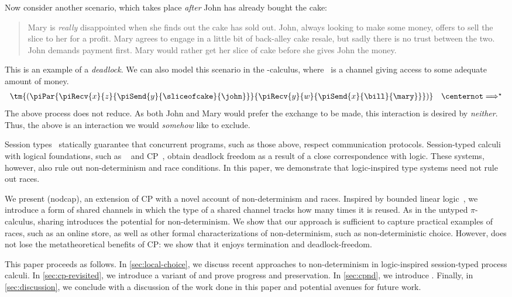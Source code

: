 \documentclass[UKenglish]{llncs}
\begin{document}
Now consider another scenario, which takes place \emph{after} John has already
bought the cake:
\begin{quote}
  Mary is \emph{really} disappointed when she finds out the cake has sold out.
  John, always looking to make some money, offers to sell the slice to her for a
  profit. Mary agrees to engage in a little bit of back-alley cake resale, but
  sadly there is no trust between the two.
  John demands payment first.
  Mary would rather get her slice of cake before she gives John the money.
\end{quote}
This is an example of a \emph{deadlock}. We can also model this scenario in the
\textpi-calculus, where \bill\ is a channel giving access to some adequate
amount of money. 
\[
  \begin{array}{c}
    \tm{(\piPar{%
    \piRecv{x}{z}{\piSend{y}{\sliceofcake}{\john}}
    }{%
    \piRecv{y}{w}{\piSend{x}{\bill}{\mary}}
    })}
    \quad
    \centernot\Longrightarrow^{\star}
  \end{array}  
\]
The above process does not reduce. As both John and Mary would prefer the
exchange to be made, this interaction is desired by \emph{neither}. Thus, the
above is an interaction we would \emph{somehow} like to exclude.

Session types~\parencite{honda1993} statically guarantee that concurrent
programs, such as those above, respect communication protocols.
Session-typed calculi with logical foundations, such as
\piDILL~\parencite{caires2010} and CP~\parencite{wadler2012}, obtain deadlock freedom as a
result of a close correspondence with logic.
These systems, however, also rule out non-determinism and race conditions. In
this paper, we demonstrate that logic-inspired type systems need not rule out
races.

We present \nodcap (nodcap), an extension of CP with a novel account of
non-determinism and races.
Inspired by bounded linear logic~\parencite{girard1992}, we introduce a form of
shared channels in which the type of a shared channel tracks how many times it
is reused.
As in the untyped $\pi$-calculus, sharing introduces the potential for
non-determinism.
We show that our approach is sufficient to capture practical examples of races,
such as an online store, as well as other formal characterizations of
non-determinism, such as non-deterministic choice.  However, \nodcap does not
lose the metatheoretical benefits of CP: we show that it enjoys termination and
deadlock-freedom.

This paper proceeds as follows.
In \cref{sec:local-choice}, we discuss recent approaches to non-determinism in
logic-inspired session-typed process calculi.
In \cref{sec:cp-revisited}, we introduce a variant of \cp and prove progress and
preservation.
In \cref{sec:cpnd}, we introduce \nodcap.
Finally, in \cref{sec:discussion}, we conclude with a discussion of the work
done in this paper and potential avenues for future work.
\end{document}
